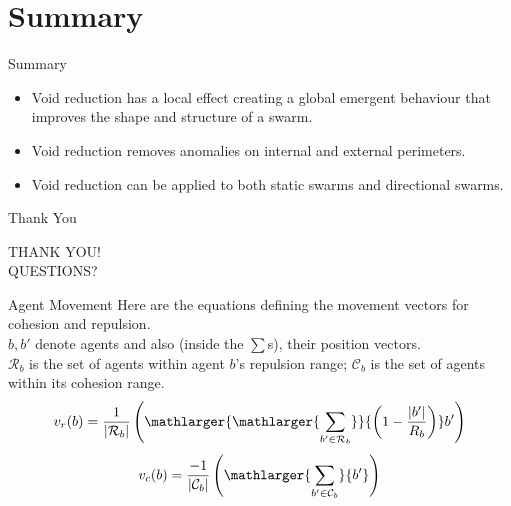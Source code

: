 \documentclass{beamer}
\newcommand{\card}[1]{\vert{#1}\vert}
\newcommand{\magn}[1]{\vert{#1}\vert}
\begin{document}
\section*{Summary}

\begin{frame}{Summary}
  \begin{itemize}
  \item
    \alert{Void reduction} has a local effect creating a global emergent behaviour that improves the shape and structure of a swarm.
  \item
    \alert{Void reduction} removes anomalies on internal and external perimeters.
  \item
    \alert{Void reduction} can be applied to both static swarms and directional swarms.
  \end{itemize}
\end{frame}


\begin{frame}{Thank You}
  \begin{center}
  THANK YOU!\\
  QUESTIONS?
  \end{center}
\end{frame}


\begin{frame}{Agent Movement}
Here are the equations defining the movement vectors for cohesion and repulsion. \\$b, b'$ denote agents and also (inside the $\sum$s), their position vectors. \\$\mathcal R_b$ is the set of agents within agent $b$'s repulsion range; $\mathcal C_b$ is the set of agents within its cohesion range.
  \begin{equation}\label{eq:Repulsion1}
    v_r(b) = 
    \frac{1}{\card{\mathcal R_b}}
    \left(
      \mathlarger{\mathlarger{\sum_{b' \in \mathcal R_b}}}
      {\left( 1-\frac{\magn{b'}}{R_b} \right)}
      b'
    \right)
    \end{equation}
    \begin{equation}\label{eq:FlyToCentre1}
      v_c(b) =
      \frac{-1}{\card{\mathcal C_b}}\left({\mathlarger{\sum_{b' \in
      \mathcal C_b}}{b'}}\right)
    \end{equation}
\end{frame}
\end{document}
